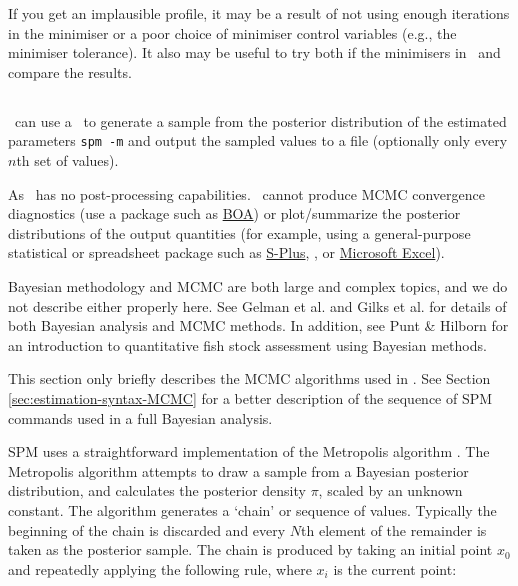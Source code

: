 If you get an implausible profile, it may be a result of not using enough iterations in the minimiser or a poor choice of minimiser control variables (e.g., the minimiser tolerance). It also may be useful to try both if the minimisers in \SPM\ and compare the results.

\subsection{\label{sec:estimate-MCMC}}

\SPM\ can use a  \NYI\ to generate a sample from the posterior distribution of the estimated parameters \texttt{spm -m} and output the sampled values to a file (optionally only every $n$th set of values).

As \SPM\ has no post-processing capabilities. \SPM\ cannot produce MCMC convergence diagnostics (use a package such as \href{http://www.public-health.uiowa.edu/boa}{BOA}) or plot/summarize the posterior distributions of the output quantities (for example, using a general-purpose statistical or spreadsheet package such as \href{http://www.insightful.com}{S-Plus}, \href{http://www.r-project.org}{\R}, or \href{http://www.microsoft.com}{Microsoft Excel}).

Bayesian methodology and MCMC are both large and complex topics, and we do not describe either properly here. See Gelman et al. \citeyearpar{823} and Gilks et al. \citeyearpar{143} for details of both Bayesian analysis and MCMC methods. In addition, see Punt \& Hilborn \citeyearpar{828} for an introduction to quantitative fish stock assessment using Bayesian methods. 

This section only briefly describes the MCMC algorithms used in \SPM. See Section \ref{sec:estimation-syntax-MCMC} for a better description of the sequence of SPM commands used in a full Bayesian analysis.

SPM uses a straightforward implementation of the Metropolis algorithm \citep{823,143}. The Metropolis algorithm attempts to draw a sample from a Bayesian posterior distribution, and calculates the posterior density $\pi$, scaled by an unknown constant. The algorithm generates a `chain' or sequence of values. Typically the beginning of the chain is discarded and every $N$th element of the remainder is taken as the posterior sample. The chain is produced by taking an initial point $x_0$ and repeatedly applying the following rule, where $x_i$ is the current point: 

